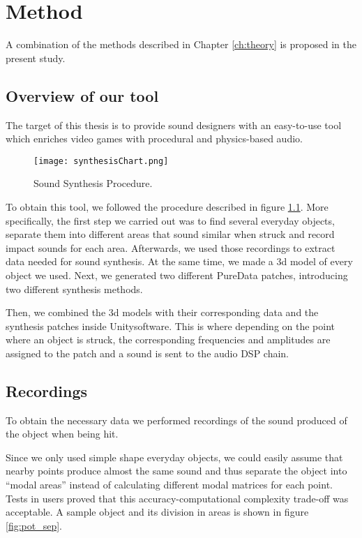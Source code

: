 \chapter{Method}\label{ch:method}

A combination of the methods described in Chapter \ref{ch:theory} is proposed in the present study.

\section{Overview of our tool}
The target of this thesis is to provide sound designers with an easy-to-use tool which enriches video games with procedural and physics-based audio.

\begin{figure}[H]
  \centering
    \texttt{[image: synthesisChart.png]}
      \caption{Sound Synthesis Procedure.}
      \label{fig:synth_proc}
\end{figure}

To obtain this tool, we followed the procedure described in figure \ref{fig:synth_proc}. More specifically, the first step we carried out was to find several everyday objects, separate them into different areas that sound similar when struck and record impact sounds for each area. Afterwards, we used those recordings to extract data needed for sound synthesis. At the same time, we made a 3d model of every object we used. Next, we generated two different PureData patches, introducing two different synthesis methods. 

Then, we combined the 3d models with their corresponding data and the synthesis patches inside Unity\textregistered software. This is where depending on the point where an object is struck, the corresponding frequencies and amplitudes are assigned to the patch and a sound is sent to the audio DSP chain.

\section{Recordings}
To obtain the necessary data we performed recordings of the sound produced of the object when being hit. 

Since we only used simple shape everyday objects, we could easily assume that nearby points produce almost the same sound and thus separate the object into ``modal areas'' instead of calculating different modal matrices for each point. Tests in users proved that this accuracy-computational complexity trade-off was acceptable. A sample object and its division in areas is shown in figure \ref{fig:pot_sep}.

